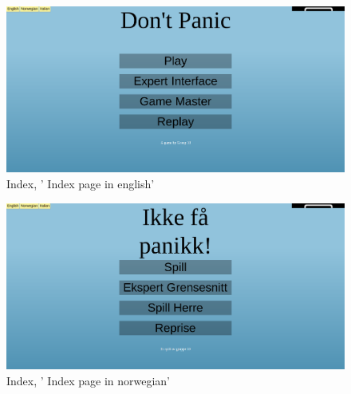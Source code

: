 
\begin{figure}[H]
  \centering
    \includegraphics[width=1.0\textwidth]{img/indexen.png}
  \caption{Index, ' Index page in english'} 
  \label{fig:indexen}
\end{figure}

\begin{figure}[H]
  \centering
    \includegraphics[width=1.0\textwidth]{img/indexno.png}
  \caption{Index, ' Index page in norwegian'} 
  \label{fig:indexno}
\end{figure}



